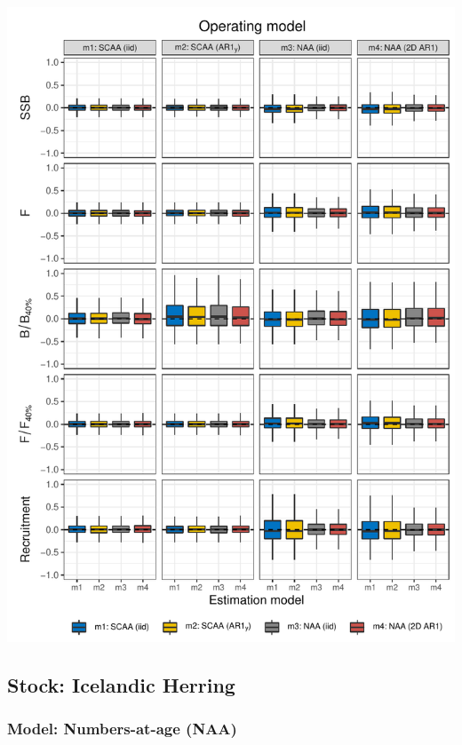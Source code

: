\documentclass[]{article}
\begin{document}
\includegraphics[width=6in]{wham-sim-paper_files/figure-latex/unnamed-chunk-3-3}

\pagebreak

\pagebreak

\hypertarget{stock-icelandic-herring}{%
\subsection{Stock: Icelandic Herring}\label{stock-icelandic-herring}}

\hypertarget{model-numbers-at-age-naa-3}{%
\subsubsection{Model: Numbers-at-age
(NAA)}\label{model-numbers-at-age-naa-3}}
\end{document}
